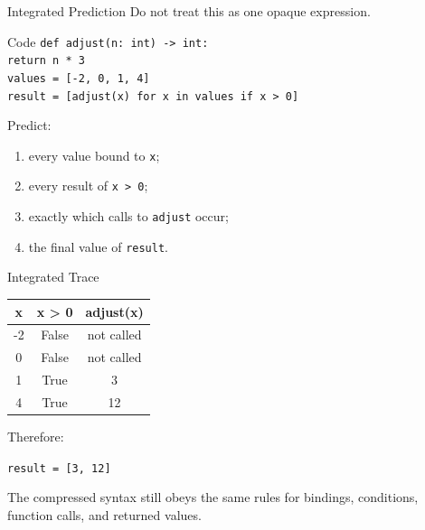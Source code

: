 \documentclass[aspectratio=169,10pt]{beamer}
\begin{document}
\begin{frame}{Integrated Prediction}
  Do not treat this as one opaque expression.

  \begin{block}{Code}
    \texttt{def adjust(n: int) -> int:}\\
    \hspace{0.20in}\texttt{return n * 3}\\[0.08in]
    \texttt{values = [-2, 0, 1, 4]}\\
    \texttt{result = [adjust(x) for x in values if x > 0]}
  \end{block}

  Predict:
  \begin{enumerate}
    \item every value bound to \texttt{x};
    \item every result of \texttt{x > 0};
    \item exactly which calls to \texttt{adjust} occur;
    \item the final value of \texttt{result}.
  \end{enumerate}
\end{frame}

\begin{frame}{Integrated Trace}
  \begin{center}
    \renewcommand{\arraystretch}{1.25}
    \begin{tabular}{c|c|c}
      \textbf{x} & \textbf{x > 0} & \textbf{adjust(x)} \\\hline
      -2 & False & not called \\
      0 & False & not called \\
      1 & True & 3 \\
      4 & True & 12
    \end{tabular}
  \end{center}

  Therefore:
  \begin{center}
    \texttt{result = [3, 12]}
  \end{center}

  The compressed syntax still obeys the same rules for bindings, conditions, function calls, and returned values.
\end{frame}
\end{document}
